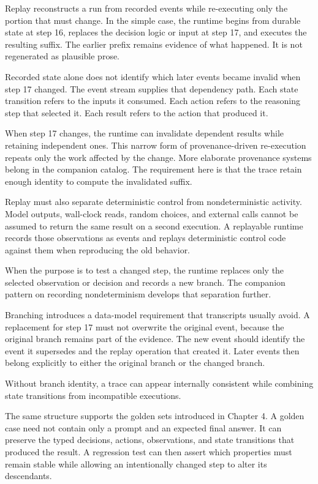 Replay reconstructs a run from recorded events while re-executing only the portion that must change. In the simple case, the runtime begins from durable state at step 16, replaces the decision logic or input at step 17, and executes the resulting suffix. The earlier prefix remains evidence of what happened. It is not regenerated as plausible prose.

Recorded state alone does not identify which later events became invalid when step 17 changed. The event stream supplies that dependency path. Each state transition refers to the inputs it consumed. Each action refers to the reasoning step that selected it. Each result refers to the action that produced it.

When step 17 changes, the runtime can invalidate dependent results while retaining independent ones. This narrow form of provenance-driven re-execution repeats only the work affected by the change. More elaborate provenance systems belong in the companion catalog. The requirement here is that the trace retain enough identity to compute the invalidated suffix.

Replay must also separate deterministic control from nondeterministic activity. Model outputs, wall-clock reads, random choices, and external calls cannot be assumed to return the same result on a second execution. A replayable runtime records those observations as events and replays deterministic control code against them when reproducing the old behavior.

When the purpose is to test a changed step, the runtime replaces only the selected observation or decision and records a new branch. The companion pattern on recording nondeterminism develops that separation further.

Branching introduces a data-model requirement that transcripts usually avoid. A replacement for step 17 must not overwrite the original event, because the original branch remains part of the evidence. The new event should identify the event it supersedes and the replay operation that created it. Later events then belong explicitly to either the original branch or the changed branch.

Without branch identity, a trace can appear internally consistent while combining state transitions from incompatible executions.

The same structure supports the golden sets introduced in Chapter 4. A golden case need not contain only a prompt and an expected final answer. It can preserve the typed decisions, actions, observations, and state transitions that produced the result. A regression test can then assert which properties must remain stable while allowing an intentionally changed step to alter its descendants.

